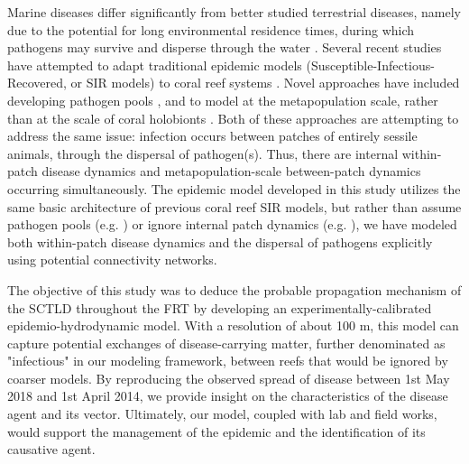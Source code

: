 \documentclass[utf8]{frontiersSCNS}
\begin{document}
Marine diseases differ significantly from better studied terrestrial diseases, namely due to the potential for long environmental residence times, during which pathogens may survive and disperse through the water \citep{harvell2007coral, sokolow2009editor}. Several recent studies have attempted to adapt traditional epidemic models (Susceptible-Infectious-Recovered, or SIR models) to coral reef systems \citep{sokolow2009editor, bidegain2016microparasitic, bidegain2016marine}. Novel approaches have included developing pathogen pools \citep{bidegain2016microparasitic, bidegain2016marine}, and to model at the metapopulation scale, rather than at the scale of coral holobionts \citep{sokolow2009editor}. Both of these approaches are attempting to address the same issue: infection occurs between patches of entirely sessile animals, through the dispersal of pathogen(s). Thus, there are internal within-patch disease dynamics and metapopulation-scale between-patch dynamics occurring simultaneously. The epidemic model developed in this study utilizes the same basic architecture of previous coral reef SIR models, but rather than assume pathogen pools (e.g. \cite{bidegain2016microparasitic, bidegain2016marine}) or ignore internal patch dynamics (e.g. \cite{sokolow2009editor}), we have modeled both within-patch disease dynamics and the dispersal of pathogens explicitly using potential connectivity networks.

The objective of this study was to deduce the probable propagation mechanism of the SCTLD throughout the FRT by developing an experimentally-calibrated epidemio-hydrodynamic model. With a resolution of about 100 m, this model can capture potential exchanges of disease-carrying matter, further denominated as "infectious" in our modeling framework, between reefs that would be ignored by coarser models. By reproducing the observed spread of disease between 1st May 2018 and 1st April 2014, we provide insight on the characteristics of the disease agent and its vector. Ultimately, our model, coupled with lab and field works, would support the management of the epidemic and the identification of its causative agent.
\end{document}
